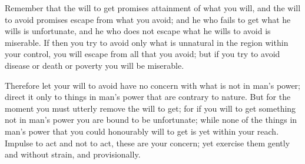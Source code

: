 Remember that  the will to  get promises attainment of  what you will,  and the
will to avoid promises escape from what you avoid; and he who fails to get what
he wills is unfortunate,  and he who does not escape what he  wills to avoid is
miserable. If then you try to avoid only what is unnatural in the region within
your control, you will escape from all that  you avoid; but if you try to avoid
disease or death or poverty you will be miserable.

Therefore let  your will to  avoid have  no concern with  what is not  in man's
power; direct it only to things in man's power that are contrary to nature. But
for the moment you must utterly remove the  will to get; for if you will to get
something not in man's power you are bound to be unfortunate; while none of the
things in man's power that you could  honourably will to get is yet within your
reach. Impulse to act and not to act, these are your concern; yet exercise them
gently and without strain, and provisionally.
